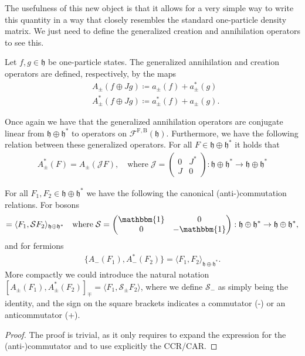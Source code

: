 The usefulness of this new object is that it allows for a very simple way to write this
quantity in a way that closely resembles the standard one-particle density matrix. We just
need to define the generalized creation and annihilation operators to see this.

\begin{definition}
	Let $f,g\in\mathfrak{h}$ be one-particle states. The generalized annihilation and creation
	operators are defined, respectively, by the maps
	\begin{align*}
		&A_\pm(f\oplus Jg) \coloneq a_\pm(f) + a^*_\pm(g) \\
		&A^*_\pm(f\oplus Jg) \coloneq a^*_\pm(f) + a_\pm(g).
	\end{align*}
\end{definition}

\begin{remark}
	Once again we have that the generalized annihilation operators are conjugate linear from
	$\mathfrak{h}\oplus\mathfrak{h}^*$ to operators on $\mathcal{F}^{\mathrm{F,B}}(\mathfrak{h})$.
	Furthermore, we have the following relation between these generalized operators. For all
	$F\in\mathfrak{h}\oplus\mathfrak{h}^*$ it holds that
	\begin{align*}
		A_\pm^*(F) = A_\pm(\mathcal{J}F),\quad\mathrm{where}\;\mathcal{J}
		= \begin{pmatrix} 0 & J^* \\ J & 0 \end{pmatrix}
		: \mathfrak{h}\oplus\mathfrak{h}^* \to \mathfrak{h}\oplus\mathfrak{h}^*
	\end{align*}
\end{remark}

\begin{proposition}
	For all $F_1,F_2\in\mathfrak{h}\oplus\mathfrak{h}^*$ we have the following the canonical
	(anti-)commutation relations. For bosons
	\begin{align*}
		[A_+(F_1),A^*_+(F_2)] = \langle F_1, \mathcal{S}F_2\rangle_{\mathfrak{h}\oplus\mathfrak{h}^*}
		\quad\mathrm{where}\;\mathcal{S}
		=\begin{pmatrix} \mathbbm{1} & 0 \\ 0 & -\mathbbm{1} \end{pmatrix}
		: \mathfrak{h}\oplus\mathfrak{h}^* \to \mathfrak{h}\oplus\mathfrak{h}^*,
	\end{align*}
	and for fermions
	\begin{align*}
		\{A_-(F_1),A^*_-(F_2)\} = \langle F_1, F_2\rangle_{\mathfrak{h}\oplus\mathfrak{h}^*}.
	\end{align*}
	More compactly we could introduce the natural notation
	$[A_\pm(F_1),A^*_\pm(F_2)]_\mp = \langle F_1,\mathcal{S}_\pm F_2\rangle$, where we define
	$\mathcal{S}_-$ as simply being the identity, and the sign on the square brackets indicates
	a commutator (-) or an anticommutator (+).
\end{proposition}
\begin{proof}
	The proof is trivial, as it only requires to expand the expression for the (anti-)commutator
	and to use explicitly the CCR/CAR.
\end{proof}

